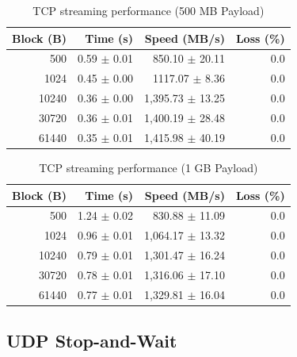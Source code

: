\documentclass[12pt,a4paper]{article}
\begin{document}
\begin{table}[H]
    \centering
    \begin{tabular}{rrrr}
        \toprule
        \textbf{Block (B)} & \textbf{Time (s)} & \textbf{Speed (MB/s)} & \textbf{Loss (\%)} \\
        \midrule
        500 & 0.59 $\pm$ 0.01 & 850.10 $\pm$ 20.11 & 0.0 \\
        1024 & 0.45 $\pm$ 0.00 & 1117.07 $\pm$ 8.36 & 0.0 \\
        10240 & 0.36 $\pm$ 0.00 & 1,395.73 $\pm$ 13.25 & 0.0 \\
        30720 & 0.36 $\pm$ 0.01 & 1,400.19 $\pm$ 28.48 & 0.0 \\
        61440 & 0.35 $\pm$ 0.01 & 1,415.98 $\pm$ 40.19 & 0.0 \\
        \bottomrule
    \end{tabular}
    \caption{TCP streaming performance (500 MB Payload)}
    \label{tab:tcp_streaming_500mb}
\end{table}

\begin{table}[H]
    \centering
    \begin{tabular}{rrrr}
        \toprule
        \textbf{Block (B)} & \textbf{Time (s)} & \textbf{Speed (MB/s)} & \textbf{Loss (\%)} \\
        \midrule
        500 & 1.24 $\pm$ 0.02 & 830.88 $\pm$ 11.09 & 0.0 \\
        1024 & 0.96 $\pm$ 0.01 & 1,064.17 $\pm$ 13.32 & 0.0 \\
        10240 & 0.79 $\pm$ 0.01 & 1,301.47 $\pm$ 16.24 & 0.0 \\
        30720 & 0.78 $\pm$ 0.01 & 1,316.06 $\pm$ 17.10 & 0.0 \\
        61440 & 0.77 $\pm$ 0.01 & 1,329.81 $\pm$ 16.04 & 0.0 \\
        \bottomrule
    \end{tabular}
    \caption{TCP streaming performance (1 GB Payload)}
    \label{tab:tcp_streaming_1gb}
\end{table}

\subsection{UDP Stop-and-Wait}
\end{document}

